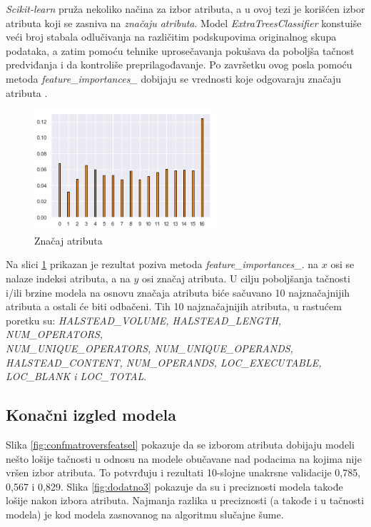 \documentclass[12pt,oneside]{memoir}
\begin{document}
\textit{Scikit-learn} pruža nekoliko načina za izbor atributa, a u ovoj tezi je korišćen izbor atributa koji se zasniva na \textit{značaju atributa}. Model \textit{ExtraTreesClassifier} konstuiše veći broj stabala odlučivanja na različitim podskupovima originalnog skupa podataka, a zatim pomoću tehnike uprosečavanja pokušava da poboljša tačnost predviđanja i da kontroliše preprilagođavanje. Po završetku ovog posla pomoću metoda \textit{feature\_importances\_} dobijaju se vrednosti koje odgovaraju značaju atributa \cite{scikit-learn}. 

\begin{figure}[!ht]
  \centering
  \includegraphics[width=0.60\textwidth]{izbor_atributa}
  \caption{Značaj atributa}
  \label{fig:znacaj}
\end{figure}

Na slici \ref{fig:znacaj} prikazan je rezultat poziva metoda \textit{feature\_importances\_}. na $x$ osi se nalaze indeksi atributa, a na $y$ osi značaj atributa. U cilju poboljšanja tačnosti i/ili brzine modela na osnovu značaja atributa biće sačuvano 10 najznačajnijih atributa a ostali će biti odbačeni. Tih 10 najznačajnijih atributa, u rastućem poretku su: \textit{HALSTEAD\_VOLUME, 
HALSTEAD\_LENGTH, 
NUM\_OPERATORS, \\
NUM\_UNIQUE\_OPERATORS, 
NUM\_UNIQUE\_OPERANDS, \\HALSTEAD\_CONTENT, 
NUM\_OPERANDS, LOC\_EXECUTABLE, \\
LOC\_BLANK i LOC\_TOTAL}.

\subsection{Konačni izgled modela}

Slika \ref{fig:confmatroversfeatsel} pokazuje da se izborom atributa dobijaju modeli nešto lošije tačnosti u odnosu na modele obučavane nad podacima na kojima nije vršen izbor atributa. To potvrđuju i rezultati 10-slojne unakrsne validacije 0,785, 0,567 i 0,829. Slika \ref{fig:dodatno3} pokazuje da su i preciznosti modela takođe lošije nakon izbora atributa. Najmanja razlika u preciznosti (a takođe i u tačnosti modela) je kod modela zasnovanog na algoritmu slučajne šume. 
\end{document}
